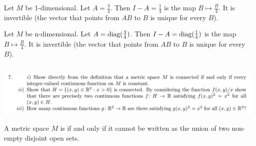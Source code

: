 \documentclass[12pt]{article}
\begin{document}
\begin{enumerate}[label=(\roman*)]
  \begin{example*}
    Let $M$ be 1-dimensional. Let $A = \frac{3}{4}$. Then $I - A = \frac{1}{4}$ is the map
    $B \mapsto \frac{B}{4}$. It is invertible (the vector that points from $AB$ to $B$ is unique
    for every $B$).
  \end{example*}

  \begin{example*}
    Let $M$ be n-dimensional. Let $A = \operatorname{\text{diag}}(\frac{3}{4})$. Then $I - A = \operatorname{\text{diag}}(\frac{1}{4})$ is the
    map $B \mapsto \frac{B}{4}$. It is invertible (the vector that points from $AB$ to $B$ is
    unique for every $B$).
  \end{example*}

\end{enumerate}


\subsection{}


\begin{mdframed}
\includegraphics[width=400pt]{img/oxford-a2-2-7.png}
\end{mdframed}

\begin{definition*}
  A metric space $M$ is  if and only if it cannot be written as the union of two
  non-empty disjoint open sets.
\end{definition*}
\end{document}

